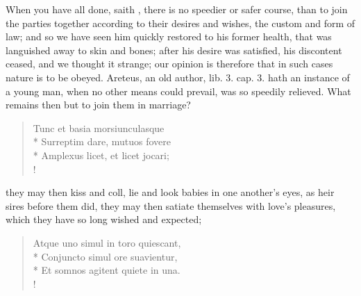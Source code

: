When you have all done, saith \Avicenna{}, there is no speedier or
safer course, than to join the parties together according to their
desires and wishes, the custom and form of law; and so we have seen him
quickly restored to his former health, that was languished away to skin
and bones; after his desire was satisfied, his discontent ceased, and
we thought it strange; our opinion is therefore that in such cases
nature is to be obeyed. Areteus, an old author, lib. 3. cap. 3. hath an
instance of a young man, when no other means could prevail, was
so speedily relieved. What remains then but to join them in marriage?
%
\begin{latin}
\begin{verse}%
Tunc et basia morsiunculasque\\*
Surreptim dare, mutuos fovere\\*
Amplexus licet, et licet jocari;\\!
\end{verse}%
\end{latin}
%

they may then kiss and coll, lie and look babies in one another's eyes,
as heir sires before them did, they may then satiate themselves with
love's pleasures, which they have so long wished and expected;
%
\begin{latin}
\begin{verse}%
Atque uno simul in toro quiescant,\\*
Conjuncto simul ore suavientur,\\*
Et somnos agitent quiete in una.\\!
\end{verse}%
\end{latin}

